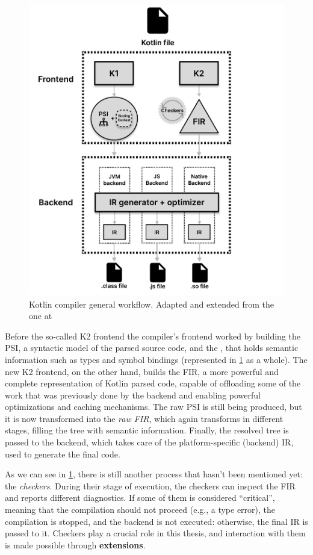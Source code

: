 \documentclass[12pt,a4paper,openright,twoside]{book}
\begin{document}
\begin{figure}
  \centering
  \includegraphics[width=.9\linewidth]{figures/kotlin-compiler-workflow.pdf}
  \caption{Kotlin compiler general workflow. Adapted and extended from the one
  at \cite{moskala2023}}
  \label{fig:kotlin-compiler-workflow}
\end{figure}

Before the so-called K2 frontend the compiler's frontend worked by
building the \ac{PSI}, a syntactic model of the parsed source code, and the
, that holds semantic information such as types and
symbol bindings (represented in \cref{fig:kotlin-compiler-workflow} as a whole). 
%
The new K2 frontend, on the other hand, builds the \ac{FIR}, a more powerful and
complete representation of Kotlin parsed code, capable of offloading some of the
work that was previously done by the backend and enabling powerful optimizations
and caching mechanisms. The raw \ac{PSI} is still being produced, but it is now
transformed into the \emph{raw FIR}, which again transforms in different stages,
filling the tree with semantic information. Finally, the resolved tree is passed
to the backend, which takes care of the platform-specific (backend) \ac{IR}, used
to generate the final code.

As we can see in \cref{fig:kotlin-compiler-workflow}, there is still another
process that hasn't been mentioned yet: the \emph{checkers}. During their stage
of execution, the checkers can inspect the \ac{FIR} and reports different
diagnostics. If some of them is considered ``critical'', meaning that the
compilation should not proceed (e.g., a type error), the compilation is stopped,
and the backend is not executed: otherwise, the final \ac{IR} is passed to it.
%
Checkers play a crucial role in this thesis, and interaction with them is made
possible through \textbf{extensions}.
\end{document}
